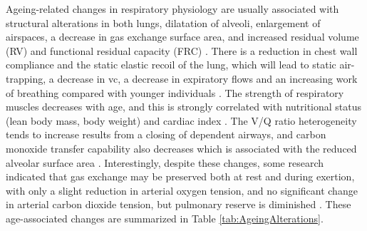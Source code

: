 Ageing-related changes in respiratory physiology are usually associated with structural alterations in both lungs, dilatation of alveoli, enlargement of airspaces, a decrease in gas exchange surface area, and increased residual volume (RV) and functional residual capacity (FRC) \citep{sprung2006age,lalley2013aging}. There is a reduction in chest wall compliance and the static elastic recoil of the lung, which will lead to static air-trapping, a decrease in \gls{vc}, a decrease in expiratory flows and an increasing work of breathing compared with younger individuals \citep{sprung2006age}. The strength of respiratory muscles decreases with age, and this is strongly correlated with nutritional status (lean body mass, body weight) and cardiac index \citep{janssens1999physiological}. The V/Q ratio heterogeneity tends to increase results from a closing of dependent airways, and carbon monoxide transfer capability also decreases which is associated with the reduced alveolar surface area \citep{janssens1999physiological}. Interestingly, despite these changes, some research indicated that gas exchange may be preserved both at rest and during exertion, with only a slight reduction in arterial oxygen tension, and no significant change in arterial carbon dioxide tension, but pulmonary reserve is diminished \citep{janssens1999physiological, sprung2006age}. These age-associated changes are summarized in Table \ref{tab:AgeingAlterations}.

